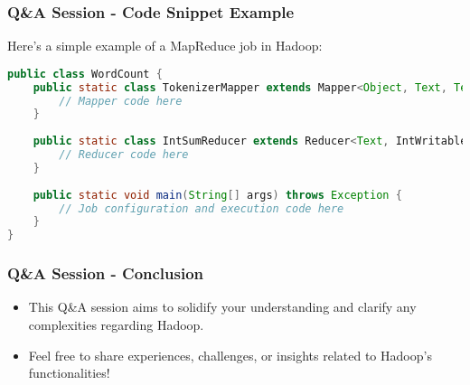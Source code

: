 \documentclass[aspectratio=169]{beamer}
\begin{document}
\begin{frame}[fragile]
    \frametitle{Q\&A Session - Code Snippet Example}
    Here’s a simple example of a MapReduce job in Hadoop:
    \begin{lstlisting}[language=java]
public class WordCount {
    public static class TokenizerMapper extends Mapper<Object, Text, Text, IntWritable> {
        // Mapper code here
    }
    
    public static class IntSumReducer extends Reducer<Text, IntWritable, Text, IntWritable> {
        // Reducer code here
    }
    
    public static void main(String[] args) throws Exception {
        // Job configuration and execution code here
    }
}
    \end{lstlisting}
\end{frame}

\begin{frame}[fragile]
    \frametitle{Q\&A Session - Conclusion}
    \begin{itemize}
        \item This Q\&A session aims to solidify your understanding and clarify any complexities regarding Hadoop.
        \item Feel free to share experiences, challenges, or insights related to Hadoop’s functionalities!
    \end{itemize}
\end{frame}
\end{document}
